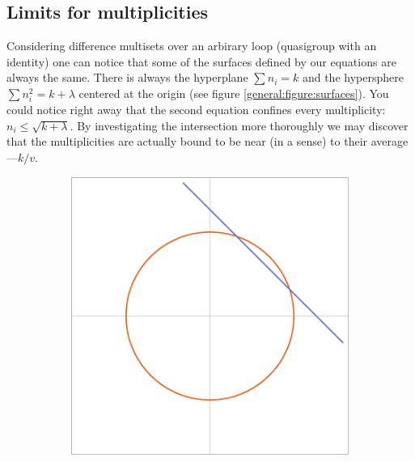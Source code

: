 \subsection{Limits for multiplicities}
    Considering difference multisets over an arbirary loop (quasigroup with an identity) one can notice that some of the surfaces defined by our equations are always the same. There is always the hyperplane $\sum {n_i} = k$ and the hypersphere $\sum n_i^2 = k + \lambda$ centered at the origin (see figure \ref{general:figure:surfaces}). You could notice right away that the second equation confines every multiplicity: $n_i \leq \sqrt{k+\lambda}$. By investigating the intersection more thoroughly we may discover that the multiplicities are actually bound to be near (in a sense) to their average---$k/v$.

    \begin{figure}
        \centering
        \begin{subfigure}[b]{0.5\textwidth}
            \includegraphics[width=\textwidth]{assets/surfacesIn2D}
        \end{subfigure}%
        ~
        \begin{subfigure}[b]{0.5\textwidth}

\end{subfigure}
\end{figure}
